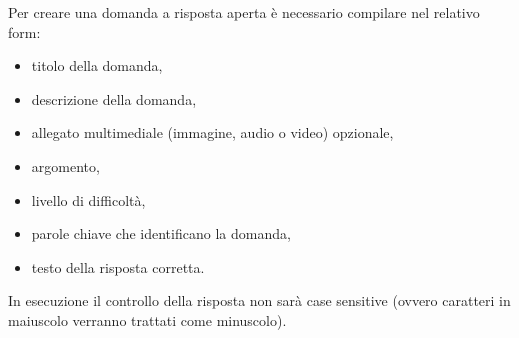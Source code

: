 \documentclass[a4paper, titlepage]{article}
\begin{document}
	 Per creare una domanda a risposta aperta è necessario compilare nel relativo form:
	 \begin{itemize}
	 	\item titolo della domanda,
	 	\item descrizione della domanda,
	 	\item allegato multimediale (immagine, audio o video) opzionale,
	 	\item argomento,
	 	\item livello di difficoltà,
	 	\item parole chiave che identificano la domanda,
	 	\item testo della risposta corretta.
	 \end{itemize}
	 In esecuzione il controllo della risposta non sarà case sensitive (ovvero caratteri in maiuscolo verranno trattati come minuscolo).
	 
	 \newpage
\end{document}
